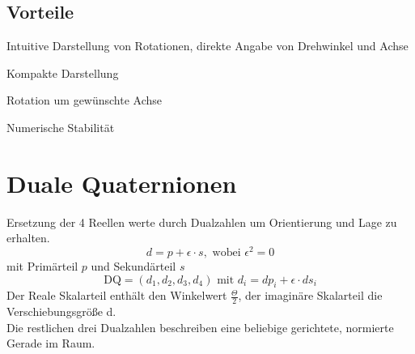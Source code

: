\subsection{Vorteile}
\begin{compactitem}
    \item Intuitive Darstellung von Rotationen, direkte Angabe von Drehwinkel und Achse
    \item Kompakte Darstellung
    \item Rotation um gewünschte Achse
    \item Numerische Stabilität
\end{compactitem}

\section{Duale Quaternionen}
Ersetzung der 4 Reellen werte durch Dualzahlen um Orientierung und Lage zu erhalten.
\begin{displaymath}
     d = p + \epsilon \cdot s, \text{ wobei }\epsilon^2 = 0
\end{displaymath}
mit Primärteil $p$ und Sekundärteil $s$
\begin{displaymath}
     \text{DQ} = (d_1,d_2,d_3,d_4) \text{ mit } d_i = dp_i + \epsilon \cdot ds_i
\end{displaymath}
Der Reale Skalarteil enthält den Winkelwert $\frac{\Theta}{2}$, der imaginäre Skalarteil die
Verschiebungsgröße d. \\
Die restlichen drei Dualzahlen beschreiben eine beliebige gerichtete, normierte Gerade im Raum.
